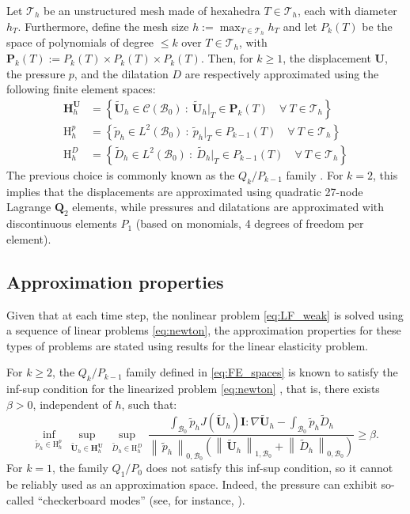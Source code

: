 \documentclass{sfuthesis}
\numberwithin{equation}{section}
\numberwithin{figure}{chapter}
\numberwithin{table}{chapter}
\theoremstyle{definition}
\def\*#1{{\mathbf{#1}}} %
\newcommand{\B}{\mathcal{B}}
\newcommand{\Hhu}{\mathbf{H}_h^{\*U}}
\newcommand{\Hhp}{\mathrm{H}_h^{p}}
\newcommand{\HhD}{\mathrm{H}_h^{D}}
\newcommand{\norm}[1]{{\left\| \, #1 \, \right\|}}
\begin{document}
Let $\mathcal{T}_h$ be an unstructured mesh made of hexahedra $T \in \mathcal{T}_h$, each with diameter $h_T$. Furthermore, define the mesh size $h := \max_{T \in \mathcal{T}_h} h_T$ and let $P_k(T)$ be the space of polynomials of degree $\leq k$ over $T \in \mathcal{T}_h$, with $\*P_k(T) := P_k(T) \times P_k(T) \times P_k(T)$. Then, for $k \geq 1$, the displacement $\*U$, the pressure $p$, and the dilatation $D$ are respectively approximated using the following finite element spaces:
\begin{subequations} \label{eq:FE_spaces}
\begin{align}
    \label{eq:Hhu} \Hhu &= \left\{ \widetilde{\*U}_h \in \mathcal{C}(\B_0) \ : \ \widetilde{\*U}_h \Big|_T \in \*P_{k}(T) \quad \forall \ T \in \mathcal{T}_h \right\} \\
    \label{eq:Hhp} \Hhp &= \left\{ \widetilde{p}_h \in L^2(\B_0) \ : \ \widetilde{p}_h \Big|_T \in P_{k-1}(T) \quad \forall \ T \in \mathcal{T}_h \right\} \\
    \label{eq:Hhd} \HhD &= \left\{ \widetilde{D}_h \in L^2(\B_0) \ : \ \widetilde{D}_h \Big|_T \in P_{k-1}(T) \quad \forall \ T \in \mathcal{T}_h \right\}
\end{align}
\end{subequations}
The previous choice is commonly known as the $Q_k/P_{k-1}$ family \cite{BoffiBrezziFortin2013}. For $k=2$, this implies that the displacements are approximated using quadratic 27-node Lagrange $\*Q_2$ elements, while pressures and dilatations are approximated with discontinuous elements $P_1$ (based on monomials, 4 degrees of freedom per element). 

\subsection{Approximation properties} \label{sec:FE_approximation_properties}

Given that at each time step, the nonlinear problem \eqref{eq:LF_weak} is solved using a sequence of linear problems \eqref{eq:newton}, the approximation properties for these types of problems are stated using results for the linear elasticity problem.

For $k \geq 2$, the $Q_k/P_{k-1}$ family defined in \eqref{eq:FE_spaces} is known to satisfy the inf-sup condition for the linearized problem \eqref{eq:newton} \cite{BrinkStein1996}, that is, there exists $\beta > 0$, independent of $h$, such that:
\begin{equation}
    \inf_{\widetilde{p}_h \in \Hhp} \ \sup_{\widetilde{\*U}_h \in \Hhu} \ \sup_{\widetilde{D}_h \in \HhD} \ \dfrac{\displaystyle \int_{\B_0} \widetilde{p}_h J(\widetilde{\*U}_h) \*I : \nabla \widetilde{\*U}_h - \int_{\B_0} \widetilde{p}_h \widetilde{D}_h}{\norm{\widetilde{p}_h}_{0,\B_0} \left( \norm{\widetilde{\*U}_h}_{1,\B_0} + \norm{\widetilde{D}_h}_{0,\B_0} \right)} \geq \beta.
\end{equation}
For $k=1$, the family $Q_1/P_0$ does not satisfy this inf-sup condition, so it cannot be reliably used as an approximation space. Indeed, the pressure can exhibit so-called ``checkerboard modes'' (see, for instance, \cite{Kadapa2024}).
\end{document}
